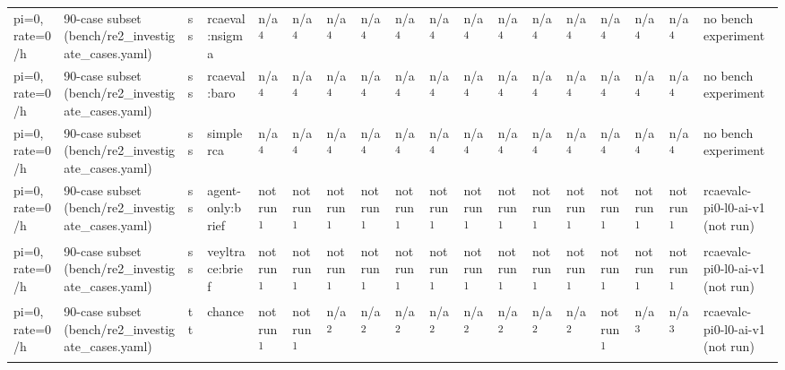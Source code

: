 \begin{table}[t]
\begin{tabular}{llllllllllllllllll}
pi=0, rate=0/h & 90-case subset (bench/re2\_investigate\_cases.yaml) & ss & rcaeval:nsigma & n/a\textsuperscript{4} & n/a\textsuperscript{4} & n/a\textsuperscript{4} & n/a\textsuperscript{4} & n/a\textsuperscript{4} & n/a\textsuperscript{4} & n/a\textsuperscript{4} & n/a\textsuperscript{4} & n/a\textsuperscript{4} & n/a\textsuperscript{4} & n/a\textsuperscript{4} & n/a\textsuperscript{4} & n/a\textsuperscript{4} & no bench experiment \\
pi=0, rate=0/h & 90-case subset (bench/re2\_investigate\_cases.yaml) & ss & rcaeval:baro & n/a\textsuperscript{4} & n/a\textsuperscript{4} & n/a\textsuperscript{4} & n/a\textsuperscript{4} & n/a\textsuperscript{4} & n/a\textsuperscript{4} & n/a\textsuperscript{4} & n/a\textsuperscript{4} & n/a\textsuperscript{4} & n/a\textsuperscript{4} & n/a\textsuperscript{4} & n/a\textsuperscript{4} & n/a\textsuperscript{4} & no bench experiment \\
pi=0, rate=0/h & 90-case subset (bench/re2\_investigate\_cases.yaml) & ss & simplerca & n/a\textsuperscript{4} & n/a\textsuperscript{4} & n/a\textsuperscript{4} & n/a\textsuperscript{4} & n/a\textsuperscript{4} & n/a\textsuperscript{4} & n/a\textsuperscript{4} & n/a\textsuperscript{4} & n/a\textsuperscript{4} & n/a\textsuperscript{4} & n/a\textsuperscript{4} & n/a\textsuperscript{4} & n/a\textsuperscript{4} & no bench experiment \\
pi=0, rate=0/h & 90-case subset (bench/re2\_investigate\_cases.yaml) & ss & agent-only:brief & not run\textsuperscript{1} & not run\textsuperscript{1} & not run\textsuperscript{1} & not run\textsuperscript{1} & not run\textsuperscript{1} & not run\textsuperscript{1} & not run\textsuperscript{1} & not run\textsuperscript{1} & not run\textsuperscript{1} & not run\textsuperscript{1} & not run\textsuperscript{1} & not run\textsuperscript{1} & not run\textsuperscript{1} & rcaevalc-pi0-l0-ai-v1 (not run) \\
pi=0, rate=0/h & 90-case subset (bench/re2\_investigate\_cases.yaml) & ss & veyltrace:brief & not run\textsuperscript{1} & not run\textsuperscript{1} & not run\textsuperscript{1} & not run\textsuperscript{1} & not run\textsuperscript{1} & not run\textsuperscript{1} & not run\textsuperscript{1} & not run\textsuperscript{1} & not run\textsuperscript{1} & not run\textsuperscript{1} & not run\textsuperscript{1} & not run\textsuperscript{1} & not run\textsuperscript{1} & rcaevalc-pi0-l0-ai-v1 (not run) \\
pi=0, rate=0/h & 90-case subset (bench/re2\_investigate\_cases.yaml) & tt & chance & not run\textsuperscript{1} & not run\textsuperscript{1} & n/a\textsuperscript{2} & n/a\textsuperscript{2} & n/a\textsuperscript{2} & n/a\textsuperscript{2} & n/a\textsuperscript{2} & n/a\textsuperscript{2} & n/a\textsuperscript{2} & n/a\textsuperscript{2} & not run\textsuperscript{1} & n/a\textsuperscript{3} & n/a\textsuperscript{3} & rcaevalc-pi0-l0-ai-v1 (not run) \\

\end{tabular}
\end{table}
